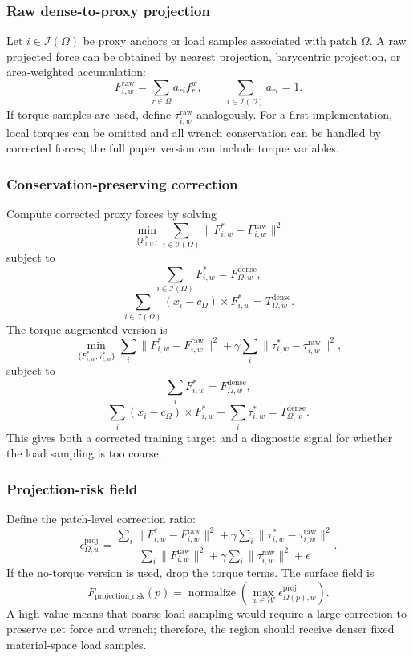 \documentclass[11pt,a4paper]{article}
\newcommand{\normalize}{\operatorname{normalize}}
\begin{document}
\subsubsection{Raw dense-to-proxy projection}
Let $i\in\mathcal{I}(\Omega)$ be proxy anchors or load samples associated with patch $\Omega$. A raw projected force can be obtained by nearest projection, barycentric projection, or area-weighted accumulation:
\[
F_{i,w}^{\mathrm{raw}}=\sum_{r\in\Omega} a_{ri} f_r^w,
\qquad
\sum_{i\in\mathcal{I}(\Omega)}a_{ri}=1.
\]
If torque samples are used, define $\tau_{i,w}^{\mathrm{raw}}$ analogously. For a first implementation, local torques can be omitted and all wrench conservation can be handled by corrected forces; the full paper version can include torque variables.

\subsubsection{Conservation-preserving correction}
Compute corrected proxy forces by solving
\[
\min_{\{F_{i,w}^*\}}
\sum_{i\in\mathcal{I}(\Omega)}\|F_{i,w}^*-F_{i,w}^{\mathrm{raw}}\|^2
\]
subject to
\[
\sum_{i\in\mathcal{I}(\Omega)}F_{i,w}^*=F_{\Omega,w}^{\mathrm{dense}},
\]
\[
\sum_{i\in\mathcal{I}(\Omega)}(x_i-c_\Omega)\times F_{i,w}^*=T_{\Omega,w}^{\mathrm{dense}}.
\]
The torque-augmented version is
\[
\min_{\{F_{i,w}^*,\tau_{i,w}^*\}}
\sum_i\|F_{i,w}^*-F_{i,w}^{\mathrm{raw}}\|^2
+\gamma\sum_i\|\tau_{i,w}^*-\tau_{i,w}^{\mathrm{raw}}\|^2,
\]
subject to
\[
\sum_iF_{i,w}^*=F_{\Omega,w}^{\mathrm{dense}},
\]
\[
\sum_i(x_i-c_\Omega)\times F_{i,w}^*+\sum_i\tau_{i,w}^*=T_{\Omega,w}^{\mathrm{dense}}.
\]
This gives both a corrected training target and a diagnostic signal for whether the load sampling is too coarse.

\subsubsection{Projection-risk field}
Define the patch-level correction ratio:
\[
\epsilon_{\Omega,w}^{\mathrm{proj}}=
\frac{
\sum_i\|F_{i,w}^*-F_{i,w}^{\mathrm{raw}}\|^2
+\gamma\sum_i\|\tau_{i,w}^*-\tau_{i,w}^{\mathrm{raw}}\|^2
}{
\sum_i\|F_{i,w}^{\mathrm{raw}}\|^2
+\gamma\sum_i\|\tau_{i,w}^{\mathrm{raw}}\|^2
+\epsilon
}.
\]
If the no-torque version is used, drop the torque terms. The surface field is
\[
F_{\mathrm{projection\_risk}}(p)=
\normalize\left(
\max_{w\in\mathcal{W}}
\epsilon_{\Omega(p),w}^{\mathrm{proj}}
\right).
\]
A high value means that coarse load sampling would require a large correction to preserve net force and wrench; therefore, the region should receive denser fixed material-space load samples.
\end{document}
